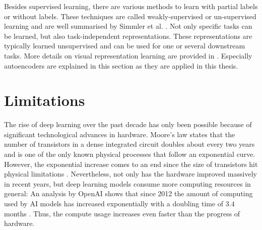 Besides supervised learning, there are various methods to learn with partial labels or without labels.
These techniques are called weakly-supervised or un-supervised learning and are well summarised by Simmler et al. .
Not only specific tasks can be learned, but also task-independent representations.
These representations are typically learned unsupervised and can be used for one or several downstream tasks.
More details on visual representation learning are provided in .
Especially autoencoders  are explained in this section as they are applied in this thesis.


\section{Limitations}
The rise of deep learning over the past decade has only been possible because of significant technological advances in hardware.
Moore's law  states that the number of transistors in a dense integrated circuit doubles about every two years and is one of the only known physical processes that follow an exponential curve.
However, the exponential increase comes to an end since the size of transistors hit physical limitations .
Nevertheless, not only has the hardware improved massively in recent years, but deep learning models consume more computing resources in general:
An analysis by OpenAI shows that since 2012 the amount of computing used by AI models has increased exponentially with a doubling time of \(3.4\) months .
Thus, the compute usage increases even faster than the progress of hardware.

